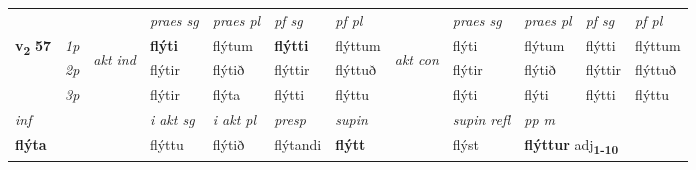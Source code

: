 \begin{longtable}[l]{X>{\footnotesize\itshape}llXXXXlXXXX}
 & &   & \textit{praes sg}  & \textit{praes pl}    & \textit{ pf sg} & \textit{pf pl} & & \textit{praes sg}  & \textit{praes pl}    & \textit{pf sg} & \textit{pf pl }  \\ \cmidrule{4-7} \cmidrule{9-12}
 \multirow{2}{*}{{{\textbf{v{\textsubscript{2}}} \Large{\textbf{57}}}}}  & 1p & \multirow{3}{*}{\begin{turn}{90}\textit{akt ind}\end{turn}} & \textbf{flýti} & flýtum & \textbf{flýtti} & flýttum & \multirow{3}{*}{\begin{turn}{90}\textit{akt con}\end{turn}} &flýti & flýtum & flýtti & flýttum\\*
 & 2p &  &  flýtir  & flýtið & flýttir & flýttuð & & flýtir & flýtið & flýttir & flýttuð \\*
 & 3p &  & flýtir & flýta & flýtti & flýttu & & flýti & flýti& flýtti & flýttu \\*
\cmidrule{4-7} \cmidrule{9-12}

   {\textit{inf}} & &  & \textit{i akt sg} & \textit{i akt pl}   & \textit{presp} & \textit{supin} && \textit{supin refl} & \textit{pp m} \\*
  {\textbf{flýta}} & && flýttu  & flýtið   & flýtandi &  \textbf{flýtt} && flýst & \multicolumn{2}{l}{\textbf{flýttur} adj\textbf{\textsubscript{1-10}}} \\*


\end{longtable}
